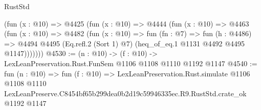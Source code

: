 \begin{lexlean}{RustStd}
\begin{coremodule}
      (fun (x : @10) =>
      @4425
        (fun (x : @10) =>
        @4444
          (fun (x : @10) =>
          @4463
            (fun (x : @10) =>
            @4482
              (fun (x : @10) =>
              fun (fn : @7) =>
              fun (h : @4486) =>
              @4494 @4495 (Eq.refl.{2} (Sort 1) @7) (heq_of_eq.{1} @1131 @4492 @4495 @1147)))))))
@4530 := (n : @10) -> (f : @10) -> LexLeanPreservation.Rust.FunSem @1106 @1108 @1110 @1192 @1147
@4540 := fun (n : @10) =>
  fun (f : @10) =>
  LexLeanPreservation.Rust.simulate
    @1106
    @1108
    @1110
    LexLeanPreserve.C8454bf65b299dea0b2d19c59946335ec.R9.RustStd.crate_ok
    @1192
    @1147
\end{coremodule}
\end{lexlean}
